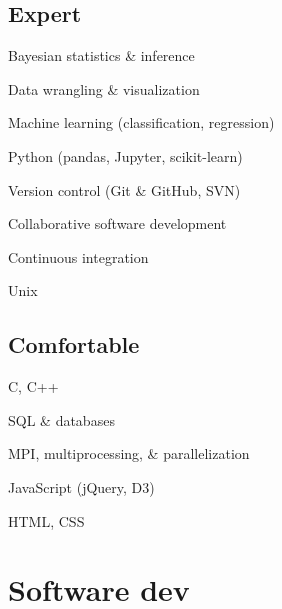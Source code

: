 \documentclass[letterpaper,12pt]{deedy-resume}
\begin{document}
\begin{minipage}[t]{0.32\textwidth}
\subsection{Expert}
\begin{tighteritemize}
    \item Bayesian statistics \& inference
    \item Data wrangling \& visualization
    \item Machine learning (classification, regression)
    \item Python {\footnotesize (pandas, Jupyter, scikit-learn)}
    \item Version control (Git \& GitHub, SVN)
    \item Collaborative software development
    \item Continuous integration
    \item Unix
\end{tighteritemize}

\sectionspace %

\subsection{Comfortable}
\begin{tighteritemize}
    \item C, C++
    \item SQL \& databases
    \item MPI, multiprocessing, \& parallelization
    \item JavaScript {\footnotesize (jQuery, D3)}
    \item HTML, CSS
\end{tighteritemize}

\sectionspace %



\section{Software dev}


\end{minipage}
\end{document}
